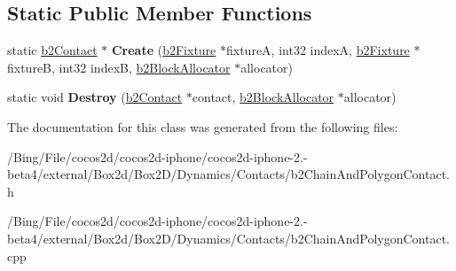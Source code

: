 \subsection*{Static Public Member Functions}
\begin{DoxyCompactItemize}
\item 
\hypertarget{classb2_chain_and_polygon_contact_a03e9021485104ae8f485f986703fcd85}{static \hyperlink{classb2_contact}{b2\-Contact} $\ast$ {\bfseries Create} (\hyperlink{classb2_fixture}{b2\-Fixture} $\ast$fixture\-A, int32 index\-A, \hyperlink{classb2_fixture}{b2\-Fixture} $\ast$fixture\-B, int32 index\-B, \hyperlink{classb2_block_allocator}{b2\-Block\-Allocator} $\ast$allocator)}\label{classb2_chain_and_polygon_contact_a03e9021485104ae8f485f986703fcd85}

\item 
\hypertarget{classb2_chain_and_polygon_contact_aa31bf71d64dd78583505b6da76ef289c}{static void {\bfseries Destroy} (\hyperlink{classb2_contact}{b2\-Contact} $\ast$contact, \hyperlink{classb2_block_allocator}{b2\-Block\-Allocator} $\ast$allocator)}\label{classb2_chain_and_polygon_contact_aa31bf71d64dd78583505b6da76ef289c}

\end{DoxyCompactItemize}


The documentation for this class was generated from the following files\-:\begin{DoxyCompactItemize}
\item 
/\-Bing/\-File/cocos2d/cocos2d-\/iphone/cocos2d-\/iphone-\/2.-\/beta4/external/\-Box2d/\-Box2\-D/\-Dynamics/\-Contacts/b2\-Chain\-And\-Polygon\-Contact.\-h\item 
/\-Bing/\-File/cocos2d/cocos2d-\/iphone/cocos2d-\/iphone-\/2.-\/beta4/external/\-Box2d/\-Box2\-D/\-Dynamics/\-Contacts/b2\-Chain\-And\-Polygon\-Contact.\-cpp\end{DoxyCompactItemize}
